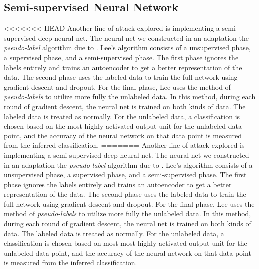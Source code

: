 \documentclass[11pt]{article}
\begin{document}
\subsection{Semi-supervised Neural Network}

<<<<<<< HEAD
Another line of attack explored is implementing a semi-supervised deep neural net. The neural net we constructed in an adaptation the \emph{pseudo-label} algorithm due to \cite{Lee:2013}. Lee's algorithm consists of a unsupervised phase, a supervised phase, and a semi-supervised phase. The first phase ignores the labels entirely and trains an autoencoder to get a better representation of the data. The second phase uses the labeled data to train the full network using gradient descent and dropout. For the final phase, Lee uses the method of \emph{pseudo-labels} to utilize more fully the unlabeled data. In this method, during each round of gradient descent, the neural net is trained on both kinds of data. The labeled data is treated as normally. For the unlabeled data, a classification is chosen based on the most highly activated output unit for the unlabeled data point, and the accuracy of the neural network on that data point is measured from the inferred classification.
=======
Another line of attack explored is implementing a semi-supervised deep neural net. The neural net we constructed in an adaptation the \emph{pseudo-label} algorithm due to \cite{Lee:2013}. Lee's algorithm consists of a unsupervised phase, a supervised phase, and a semi-supervised phase. The first phase ignores the labels entirely and trains an autoencoder to get a better representation of the data. The second phase uses the labeled data to train the full network using gradient descent and dropout. For the final phase, Lee uses the method of \emph{pseudo-labels} to utilize more fully the unlabeled data. In this method, during each round of gradient descent, the neural net is trained on both kinds of data. The labeled data is treated as normally. For the unlabeled data, a classification is chosen based on most most highly activated output unit for the unlabeled data point, and the accuracy of the neural network on that data point is measured from the inferred classification.
\end{document}
